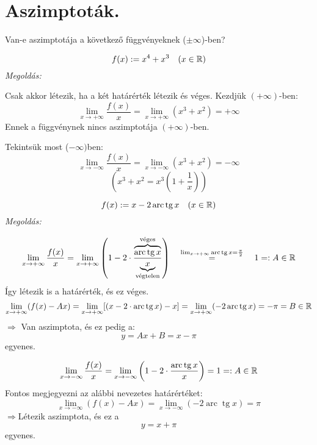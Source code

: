\documentclass[a4paper,11.5pt]{article}
\DeclareMathOperator{\tg}{tg}
\DeclareMathOperator{\arc}{arc}
\begin{document}
	\section{Aszimptoták.}
	Van-e aszimptotája a következő függvényeknek ($\pm\infty$)-ben?
	\begin{task}
		\[ f(x):=x^4+x^3\quad (x\in\mathbb{R}) \]
		\textit{Megoldás:}
		
		Csak akkor létezik, ha a két határérték létezik és véges. Kezdjük $(+\infty)$-ben:
		\[ \lim_{x\to+\infty}\frac{f(x)}{x}=\lim_{x\to+\infty}(x^3+x^2)=+\infty \]
		Ennek a függvénynek nincs aszimptotája $(+\infty)$-ben.
		
		Tekintsük most ($-\infty)$ben:
		\[ \lim_{x\to-\infty}\frac{f(x)}{x}=\lim_{x\to-\infty}(x^3+x^2)=-\infty \]
		\[ \left(x^3+x^2=x^3\left(1+\frac{1}{x}\right)\right) \]
	\end{task}
	\begin{task}
		\[ f(x):=x-2\arc\tg x\quad (x\in\R) \]
		\textit{Megoldás:}
		
		\fbox{$(+\infty):$}
		\[ \lim_{x\to+\infty}\frac{f(x)}{x}=\lim_{x\to+\infty}\left(1-2\cdot\frac{\overbrace{\arc\tg x}^{\text{véges}}}{\underbrace{x}_{\text{végtelen}}}\right) \quad \overset{\lim_{x\to+\infty}\arc\tg x = \frac{\pi}{2}}{=}\quad  1 =: A\in\R \]
		Így létezik is a határérték, és ez véges.
		\[ \lim_{x\to+\infty}(f(x)-Ax)=\lim_{x\to+\infty}[(x-2\cdot\arc\tg x)-x]=\lim_{x\to+\infty}(-2\arc\tg x)=-\pi=B\in\R \]
		$\Rightarrow$ \quad Van aszimptota, és ez pedig a:
		\[ y=Ax+B=x-\pi \]
		egyenes.
		
		\fbox{$(-\infty):$}
		\[ \lim_{x\to-\infty}\frac{f(x)}{x}=\lim_{x\to-\infty}\left(1-2\cdot\frac{\arc\tg x}{x}\right) = 1 =:A\in\R \]
		Fontos megjegyezni az alábbi nevezetes határértéket:
		\fbox{$\displaystyle \lim_{x\to-\infty}\arc\tg x = -\frac{\pi}{2}$}
		\[ \lim_{x\to-\infty}(f(x)-Ax)=\lim_{x\to-\infty}(-2\arc\tg x)=\pi \]
		$\Rightarrow$\quad Létezik aszimptota, és ez a
		\[ y=x+\pi \]
		egyenes.
	\end{task}
\end{document}

